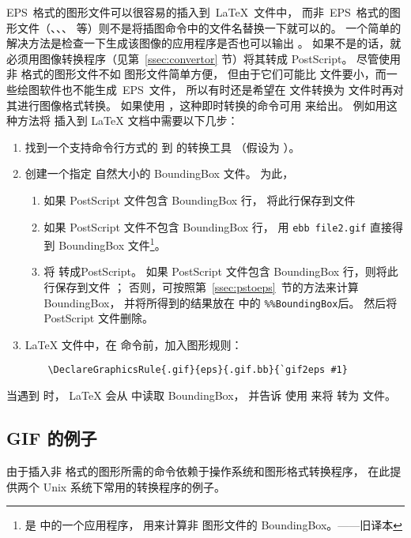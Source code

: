 EPS~格式的图形文件可以很容易的插入到~\LaTeX{}~文件中，
而非~EPS~格式的图形文件（、、、 等）则不是将插图命令中的文件名替换一下就可以的。
一个简单的解决方法是检查一下生成该图像的应用程序是否也可以输出 。
如果不是的话，就必须用图像转换程序（见第~\ref{ssec:convertor} 节）将其转成 PostScript。
尽管使用非  格式的图形文件不如  图形文件简单方便，
但由于它们可能比  文件要小，而一些绘图软件也不能生成~EPS~文件，
所以有时还是希望在  文件转换为  文件时再对其进行图像格式转换。
如果使用 ，这种即时转换的命令可用 来给出。
例如用这种方法将  插入到 \LaTeX{} 文档中需要以下几步：
\begin{enumerate}
	\item 找到一个支持命令行方式的  到  的转换工具
	（假设为 ）。
	\item 创建一个指定  自然大小的 BoundingBox 文件。
	为此，
	\begin{enumerate}
		\item 如果 PostScript 文件包含 BoundingBox 行，
		将此行保存到文件 
		\item 如果 PostScript 文件不包含 BoundingBox 行，
		用 \verb|ebb file2.gif| 直接得到 BoundingBox 文件\footnote{
			 是  中的一个应用程序，
			用来计算非 图形文件的 BoundingBox。——旧译本}。
		\item 将  转成PostScript。
		如果 PostScript 文件包含 BoundingBox 行，则将此行保存到文件 ；
		否则，可按照第~\ref{ssec:pstoeps}~节的方法来计算 BoundingBox，
		并将所得到的结果放在  中的 \verb|%%BoundingBox|后。
		然后将 PostScript 文件删除。
	\end{enumerate}
	\item \LaTeX{} 文件中，在  命令前，加入图形规则：
	\begin{lstlisting}
	\DeclareGraphicsRule{.gif}{eps}{.gif.bb}{`gif2eps #1}
	\end{lstlisting}
\end{enumerate}
当遇到  时，
\LaTeX{} 会从  中读取 BoundingBox，
并告诉  使用  来将  转为  文件。


\subsection{GIF 的例子}
由于插入非  格式的图形所需的命令依赖于操作系统和图形格式转换程序，
在此提供两个 Unix 系统下常用的转换程序的例子。

